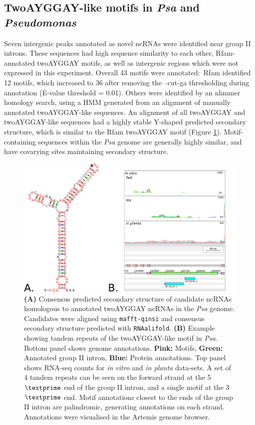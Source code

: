 \subsection{TwoAYGGAY-like motifs in \textit{Psa} and \textit{Pseudomonas}}

Seven intergenic peaks annotated as novel ncRNAs were identified near group II introns. These sequences had high sequence similarity to each other, Rfam-annotated twoAYGGAY motifs, as well as intergenic regions which were not expressed in this experiment. Overall 43 motifs were annotated$:$ Rfam identified 12 motifs, which increased to 36 after removing the --cut-ga thresholding during annotation (E-value threshold = 0.01). Others were identified by an nhmmer homology search, using a HMM generated from an alignment of manually annotated twoAYGGAY-like sequences. An alignment of all twoAYGGAY and twoAYGGAY-like sequences had a highly stable Y-shaped predicted secondary structure, which is similar to the Rfam twoAYGGAY motif (Figure \ref{fig:twoAYGGAY_genomic}). Motif-containing sequences within the \textit{Psa} genome are generally highly similar, and have covarying sites maintaining secondary structure.   

\begin{figure}[H]
    \centering
    \includegraphics[scale=1.25]{psa/psa_ncRNA/multi-twoayggay.png}
    \caption[Consensus predicted secondary structure of twoAYGGAY-like candidate ncRNAs, and example of tandem twoAYGGAY-motifs in \textit{Psa}]{\textbf{(A)} Consensus predicted secondary structure of candidate ncRNAs homologous to annotated twoAYGGAY ncRNAs in the \textit{Psa} genome. Candidates were aligned using \texttt{mafft-qinsi} and consensus secondary structure predicted with \texttt{RNAalifold}. \textbf{(B)} Example showing tandem repeats of the twoAYGGAY-like motif in \textit{Psa}. Bottom panel shows genome annotations. \textbf{Pink:} Motifs, \textbf{Green:} Annotated group II intron, \textbf{Blue:}  Protein annotations. Top panel shows RNA-seq counts for \textit{in vitro} and \textit{in planta} data-sets. A set of 4 tandem repeats can be seen on the forward strand at the 5$\textprime$ end of the group II intron, and a single motif at the 3$\textprime$ end. Motif annotations closest to the ends of the group II intron are palindromic, generating annotations on each strand. Annotations were visualised in the Artemis genome browser.}
    \label{fig:twoAYGGAY_genomic}
\end{figure}

